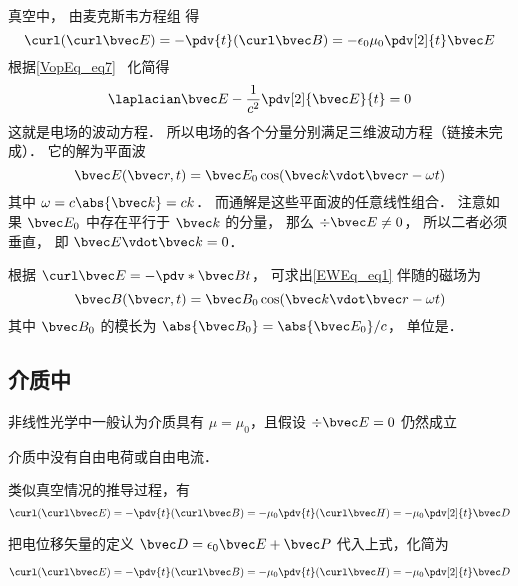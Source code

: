 
\begin{issues}
\issueDraft
\end{issues}


真空中， 由麦克斯韦方程组 得
\begin{equation}
\curl(\curl\bvec E) = -\pdv{t} (\curl\bvec B) = -\epsilon_0\mu_0 \pdv[2]{t} \bvec E
\end{equation}
根据\autoref{VopEq_eq7}~ 化简得
\begin{equation}
\laplacian \bvec E - \frac{1}{c^2} \pdv[2]{\bvec E}{t} = 0
\end{equation}
这就是电场的波动方程． 所以电场的各个分量分别满足三维波动方程（链接未完成）． 它的解为平面波
\begin{equation}\label{EWEq_eq1}
\bvec E(\bvec r, t) = \bvec E_0 \cos(\bvec k\vdot \bvec r - \omega t)
\end{equation}
其中 $\omega = c\abs{\bvec k} = ck$． 而通解是这些平面波的任意线性组合． 注意如果 $\bvec E_0$ 中存在平行于 $\bvec k$ 的分量， 那么 $\div \bvec E \ne 0$， 所以二者必须垂直， 即 $\bvec E \vdot \bvec k = 0$．

根据 $\curl \bvec E = -\pdv*{\bvec B}{t}$， 可求出\autoref{EWEq_eq1} 伴随的磁场为
\begin{equation}
\bvec B(\bvec r, t) = \bvec B_0 \cos(\bvec k \vdot \bvec r - \omega t)
\end{equation}
其中 $\bvec B_0$ 的模长为 $\abs{\bvec B_0} = \abs{\bvec E_0}/c$， 单位是．

\subsection{介质中}

非线性光学中一般认为介质具有 $\mu = \mu_0$，且假设 $\div\bvec E = 0$ 仍然成立

介质中没有自由电荷或自由电流．

类似真空情况的推导过程，有
\begin{equation}
\curl(\curl\bvec E) = -\pdv{t} (\curl\bvec B) = -\mu_0 \pdv{t} (\curl\bvec H)
= -\mu_0 \pdv[2]{t} \bvec D
\end{equation}

把电位移矢量的定义 $\bvec D = \epsilon_0\bvec E + \bvec P$ 代入上式，化简为

\begin{equation}
\curl(\curl\bvec E) = -\pdv{t} (\curl\bvec B) = -\mu_0 \pdv{t} (\curl\bvec H)
= -\mu_0 \pdv[2]{t} \bvec D
\end{equation}
